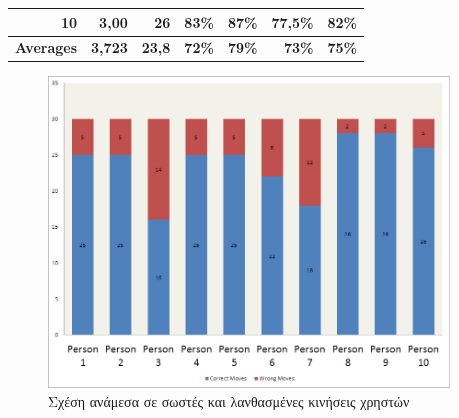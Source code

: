 \begin{table}[h]
\begin{adjustbox}{max width=\textwidth}
\begin{tabular}{|r|r|r|r|r|r|r|}
10                                                                                     & 3,00                                                                                                  & 26                                                                                                 & 83\%                               & 87\%                                & 77,5\%                                   & 82\%                               \\ \hline
{\bf Averages}                                                                         & {\bf 3,723}                                                                                           & {\bf 23,8}                                                                                         & {\bf 72\%}                         & {\bf 79\%}                          & {\bf 73\%}                               & {\bf 75\%}                         \\ \hline
\end{tabular}
\end{adjustbox}
\end{table}





\begin{figure}[H]
    \centering
    \includegraphics[width=0.95\textwidth]{Files/Figures/correctmoves.png}
    \caption[Σχέση ανάμεσα σε σωστές και λανθασμένες κινήσεις χρηστών]{Σχέση ανάμεσα σε σωστές και λανθασμένες κινήσεις χρηστών}
    \label{fig:correctmoves}
\end{figure}



